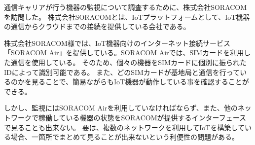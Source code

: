 
通信キャリアが行う機器の監視について調査するために、株式会社SORACOMを訪問した。
株式会社SORACOMとは、IoTプラットフォームとして、IoT機器の通信からクラウドまでの接続を提供している会社である。

株式会社SORACOM様では、IoT機器向けのインターネット接続サービス「SORACOM Air」を提供している。SORACOM Airでは、SIMカードを利用した通信を使用している。
そのため、個々の機器をSIMカードに個別に振られたIDによって識別可能である。
また、どのSIMカードが基地局と通信を行っているのかを見ることで、簡易ながらもIoT機器が動作している事を確認することができる。

しかし、監視にはSORACOM Airを利用していなければならず、また、他のネットワークで稼働している機器の状態をSORACOMが提供するインターフェースで見ることも出来ない。
要は、複数のネットワークを利用してIoTを構築している場合、一箇所でまとめて見ることが出来ないという利便性の問題がある。

